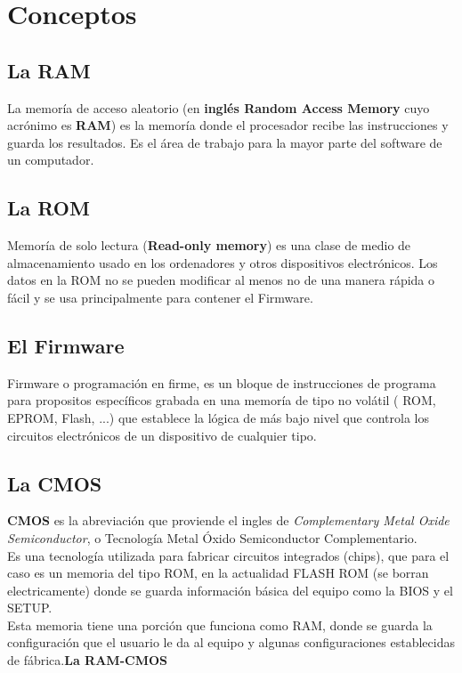 \section{Conceptos}\label{sec:conceptos}

	\subsection{La RAM}{\label{sec:conceptos/RAM}}

		La memoría de acceso aleatorio (en {\bfseries inglés Random Access Memory} cuyo
		acrónimo es {\bfseries RAM}) es la memoría donde el procesador recibe las
		instrucciones y guarda los resultados. Es el área de trabajo para la mayor
		parte del software de un computador.

	\subsection{La ROM}{\label{sec:conceptorom}}

		Memoría de solo lectura ({\bfseries Read-only memory}) es una
		clase de medio de almacenamiento usado en los ordenadores y otros dispositivos
		electrónicos. Los
		datos en la ROM no se pueden modificar al menos no de una manera rápida o fácil
		y se usa principalmente para contener el Firmware.

	\subsection{El Firmware}{\label{sec:conceptos/firmware}}

		Firmware o programación en firme, es un bloque de instrucciones de
		programa para propositos específicos grabada en una memoría de tipo no volátil
		( ROM, EPROM, Flash, ...) que establece la lógica de más bajo nivel que
		controla los circuitos electrónicos de un dispositivo de cualquier tipo.

	\subsection{La CMOS}{\label{sec:conceptos/CMOS}}

		{\bf CMOS} es la abreviación que proviende el ingles de {\em
		Complementary Metal Oxide Semiconductor}, o Tecnología Metal Óxido
		Semiconductor Complementario. \\ 
		Es una tecnología utilizada para fabricar circuitos integrados (chips),
		que para el caso es un memoria del tipo ROM, en la actualidad FLASH ROM
		(se borran electricamente) donde se guarda información básica del
		equipo como la BIOS y el SETUP.
		\\ Esta memoria tiene una porción que funciona como RAM, donde se
		guarda la configuración que el usuario le da al equipo y algunas
		configuraciones establecidas de fábrica.{\bf La RAM-CMOS} \\ 

